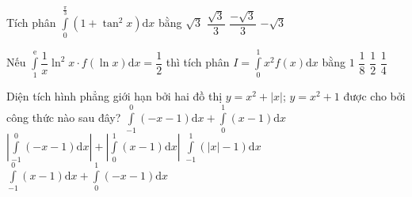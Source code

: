 \begin{ex}%
Tích phân $\displaystyle \int \limits_0^{\frac{\pi}{3}} \left(1+\tan^2 x\right) \mathrm{d}x$ bằng
\choice
	{\True $\sqrt{3} $}
	{$\dfrac{\sqrt{3}}{3} $}
	{$\dfrac{-\sqrt{3}}{3} $}
	{ $-\sqrt{3}$}
\end{ex}
\begin{ex}%
Nếu $\displaystyle \int \limits_1^{\mathrm{e}} \dfrac{1}{x} \ln^2 x \cdot f(\ln x) \mathrm{d}x=\dfrac{1}{2}$ thì tích phân $I=\displaystyle \int \limits_0^1 x^2 f(x) \mathrm{d}x$ bằng
\choice
	{ $1$}
	{$\dfrac{1}{8}$}
	{\True $\dfrac{1}{2} $}
	{ $\dfrac{1}{4}$}
\end{ex}
\begin{ex}%
Diện tích hình phẳng giới hạn bởi hai đồ thị $y=x^2+|x|$; $y=x^2+1$ được cho bởi công thức nào sau đây?
\choice
	{ $\displaystyle \int \limits_{-1}^0 (-x-1)\mathrm{d}x+\displaystyle \int \limits_{0}^1 (x-1)\mathrm{d}x$}
	{\True $\left \vert \displaystyle \int \limits_{-1}^0 (-x-1)\mathrm{d}x \right \vert+ \left \vert \displaystyle \int \limits_{0}^1 (x-1)\mathrm{d}x \right \vert$}
	{$\displaystyle \int \limits_{-1}^1 (|x|-1)\mathrm{d}x $}
	{ $\displaystyle \int \limits_{-1}^0 (x-1)\mathrm{d}x+\displaystyle \int \limits_{0}^1 (-x-1)\mathrm{d}x $}
\end{ex}


